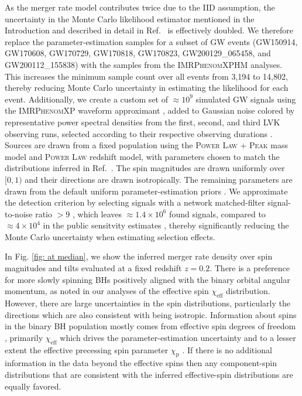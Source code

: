 \documentclass[%
 reprint,
 amsmath,amssymb,
 aps,
 prd,
 nofootinbib,nobibnotes,
]{revtex4-2}
\begin{document}
As the merger rate model contributes twice due to the IID assumption, the uncertainty in the Monte Carlo likelihood estimator mentioned in the Introduction and described in detail in Ref.~\cite{Heinzel:2024jlc} is effectively doubled. We therefore replace the parameter-estimation samples for a subset of GW events (GW150914, GW170608, GW170729, GW170818, GW170823, GW200129\_065458, and GW200112\_155838) with the samples from the \textsc{IMRPhenomXPHM} \cite{Pratten:2020ceb} analyses. This increases the minimum sample count over all events from 3,194 to 14,802, thereby reducing Monte Carlo uncertainty in estimating the likelihood for each event. Additionally, we create a custom set of $\approx 10^9$ simulated GW signals using the \textsc{IMRPhenomXP} waveform approximant \cite{Pratten:2020ceb}, added to Gaussian noise colored by representative power spectral densities from the first, second, and third LVK observing runs, selected according to their respective observing durations \cite{KAGRA:2013rdx}. Sources are drawn from a fixed population using the \textsc{Power Law + Peak} mass model and \textsc{Power Law} redshift model, with parameters chosen to match the distributions inferred in Ref.~\cite{KAGRA:2021duu}. The spin magnitudes are drawn uniformly over $[0,1)$ and their directions are drawn isotropically. The remaining parameters are drawn from the default uniform parameter-estimation priors \cite{LIGOScientific:2021djp}. We approximate the detection criterion by selecting signals with a network matched-filter signal-to-noise ratio $>9$ \cite{Essick:2023toz}, which leaves $\approx1.4\times10^6$ found signals, compared to $\approx4\times10^4$ in the public sensitvity estimates \cite{ligo_scientific_collaboration_and_virgo_2023_7890398}, thereby significantly reducing the Monte Carlo uncertainty when estimating selection effects.

In Fig. \ref{fig: at median}, we show the inferred merger rate density over spin magnitudes and tilts evaluated at a fixed redshift $z=0.2$. There is a preference for more slowly spinning BHs positively aligned with the binary orbital angular momentum, as noted in our analyses of the
effective spin $\chi_\mathrm{eff}$ distribution. However, there are large uncertainties in the spin distributions, particularly the directions which are also consistent with being isotropic. Information about spins in the binary BH population mostly comes from effective spin degrees of freedom \cite{Miller:2024sui}, primarily $\chi_\mathrm{eff}$ which drives the parameter-estimation uncertainty and to a lesser extent the effective precessing spin parameter $\chi_\mathrm{p}$ \cite{Hannam:2013oca, Schmidt:2014iyl}. If there is no additional information in the data beyond the effective spins then any component-spin distributions that are consistent with the inferred effective-spin distributions are equally favored.
\end{document}

